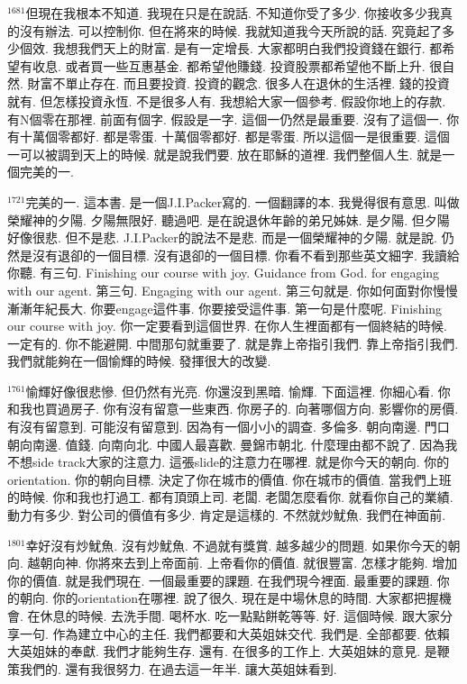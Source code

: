 \documentclass{book}
\begin{document}
$^{1681}$但現在我根本不知道.
我現在只是在說話.
不知道你受了多少.
你接收多少我真的沒有辦法.
可以控制你.
但在將來的時候.
我就知道我今天所說的話.
究竟起了多少個效.
我想我們天上的財富.
是有一定增長.
大家都明白我們投資錢在銀行.
都希望有收息.
或者買一些互惠基金.
都希望他賺錢.
投資股票都希望他不斷上升.
很自然.
財富不單止存在.
而且要投資.
投資的觀念.
很多人在退休的生活裡.
錢的投資就有.
但怎樣投資永恆.
不是很多人有.
我想給大家一個參考.
假設你地上的存款.
有N個零在那裡.
前面有個字.
假設是一字.
這個一仍然是最重要.
沒有了這個一.
你有十萬個零都好.
都是零蛋.
十萬個零都好.
都是零蛋.
所以這個一是很重要.
這個一可以被調到天上的時候.
就是說我們要.
放在耶穌的道裡.
我們整個人生.
就是一個完美的一.

$^{1721}$完美的一.
這本書.
是一個J.I.Packer寫的.
一個翻譯的本.
我覺得很有意思.
叫做榮耀神的夕陽.
夕陽無限好.
聽過吧.
是在說退休年齡的弟兄姊妹.
是夕陽.
但夕陽好像很悲.
但不是悲.
J.I.Packer的說法不是悲.
而是一個榮耀神的夕陽.
就是說.
仍然是沒有退卻的一個目標.
沒有退卻的一個目標.
你看不看到那些英文細字.
我讀給你聽.
有三句.
Finishing our course with joy.
Guidance from God.
for engaging with our agent.
第三句.
Engaging with our agent.
第三句就是.
你如何面對你慢慢漸漸年紀長大.
你要engage這件事.
你要接受這件事.
第一句是什麼呢.
Finishing our course with joy.
你一定要看到這個世界.
在你人生裡面都有一個終結的時候.
一定有的.
你不能避開.
中間那句就重要了.
就是靠上帝指引我們.
靠上帝指引我們.
我們就能夠在一個愉輝的時候.
發揮很大的改變.

$^{1761}$愉輝好像很悲慘.
但仍然有光亮.
你還沒到黑暗.
愉輝.
下面這裡.
你細心看.
你和我也買過房子.
你有沒有留意一些東西.
你房子的.
向著哪個方向.
影響你的房價.
有沒有留意到.
可能沒有留意到.
因為有一個小小的調查.
多倫多.
朝向南邊.
門口朝向南邊.
值錢.
向南向北.
中國人最喜歡.
曼錦市朝北.
什麼理由都不說了.
因為我不想side track大家的注意力.
這張slide的注意力在哪裡.
就是你今天的朝向.
你的orientation.
你的朝向目標.
決定了你在城市的價值.
你在城市的價值.
當我們上班的時候.
你和我也打過工.
都有頂頭上司.
老闆.
老闆怎麼看你.
就看你自己的業績.
動力有多少.
對公司的價值有多少.
肯定是這樣的.
不然就炒魷魚.
我們在神面前.

$^{1801}$幸好沒有炒魷魚.
沒有炒魷魚.
不過就有獎賞.
越多越少的問題.
如果你今天的朝向.
越朝向神.
你將來去到上帝面前.
上帝看你的價值.
就很豐富.
怎樣才能夠.
增加你的價值.
就是我們現在.
一個最重要的課題.
在我們現今裡面.
最重要的課題.
你的朝向.
你的orientation在哪裡.
說了很久.
現在是中場休息的時間.
大家都把握機會.
在休息的時候.
去洗手間.
喝杯水.
吃一點點餅乾等等.
好.
這個時候.
跟大家分享一句.
作為建立中心的主任.
我們都要和大英姐妹交代.
我們是.
全部都要.
依賴大英姐妹的奉獻.
我們才能夠生存.
還有.
在很多的工作上.
大英姐妹的意見.
是鞭策我們的.
還有我很努力.
在過去這一年半.
讓大英姐妹看到.
\end{document}
